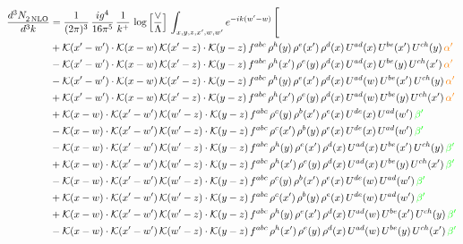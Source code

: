 \documentclass[9pt]{article}
\numberwithin{equation}{section}
\begin{document}
\begin{align}
  \frac{d^{3}N_{2\,\rm NLO}^{\rm}}{d^{3}k}  & = \frac{1}{(2\pi)^{3}}\, \frac{ig^{4}}{16\pi^{5}}\, \frac{1}{k^{+}}\, \log{\left[\frac{\vee}{\Lambda}\right]}\, \int_{x,y,z,x^{\prime},w,w^{\prime}}e^{-ik(w^{\prime}-w)}\, \Bigg[\notag \\ &   +\mathcal{K}(x'-w')\cdot\mathcal{K}(x-w)\,\mathcal{K}(x'-z)\cdot\mathcal{K}(y-z)\, f^{abc}\,\rho^{h}(y)\,\rho^{e}(x')\,\rho^{d}(x)\,U^{ad}(x)\,U^{be}(x')\,U^{ch}(y)\,{\color{orange}\alpha'}\notag\\ &-\mathcal{K}(x'-w')\cdot\mathcal{K}(x-w)\,\mathcal{K}(x'-z)\cdot\mathcal{K}(y-z)\, f^{abc}\,\rho^{h}(x')\,\rho^{e}(y)\,\rho^{d}(x)\,U^{ad}(x)\,U^{be}(y)\,U^{ch}(x')\,{\color{orange}\alpha'}\notag\\ &-\mathcal{K}(x'-w')\cdot\mathcal{K}(x-w)\,\mathcal{K}(x'-z)\cdot\mathcal{K}(y-z)\, f^{abc}\,\rho^{h}(y)\,\rho^{e}(x')\,\rho^{d}(x)\,U^{ad}(w)\,U^{be}(x')\,U^{ch}(y)\,{\color{orange}\alpha'}\notag \\ &+\mathcal{K}(x'-w')\cdot\mathcal{K}(x-w)\,\mathcal{K}(x'-z)\cdot\mathcal{K}(y-z)\, f^{abc}\,\rho^{h}(x')\,\rho^{e}(y)\,\rho^{d}(x)\,U^{ad}(w)\,U^{be}(y)\,U^{ch}(x')\,{\color{orange}\alpha'}\notag \\ & +\mathcal{K}(x-w)\cdot\mathcal{K}(x'-w')\,\mathcal{K}(w'-z)\cdot\mathcal{K}(y-z)\, f^{abc}\,\rho^{c}(y)\,\rho^{b}(x')\,\rho^{e}(x)\,U^{de}(x)\,U^{ad}(w')\,{\color{green}\beta'}\notag \\ &-\mathcal{K}(x-w)\cdot\mathcal{K}(x'-w')\,\mathcal{K}(w'-z)\cdot\mathcal{K}(y-z)\, f^{abc}\,\rho^{c}(x')\,\rho^{b}(y)\,\rho^{e}(x)\,U^{de}(x)\,U^{ad}(w')\,{\color{green}\beta'}\notag \\ & -\mathcal{K}(x-w)\cdot\mathcal{K}(x'-w')\,\mathcal{K}(w'-z)\cdot\mathcal{K}(y-z)\, f^{abc}\,\rho^{h}(y)\,\rho^{e}(x')\,\rho^{d}(x)\,U^{ad}(x)\,U^{be}(x')\,U^{ch}(y)\,{\color{green}\beta'}\notag\\ &+\mathcal{K}(x-w)\cdot\mathcal{K}(x'-w')\,\mathcal{K}(w'-z)\cdot\mathcal{K}(y-z)\, f^{abc}\,\rho^{h}(x')\,\rho^{e}(y)\,\rho^{d}(x)\,U^{ad}(x)\,U^{be}(y)\,U^{ch}(x')\,{\color{green}\beta'}\notag\\ &-\mathcal{K}(x-w)\cdot\mathcal{K}(x'-w')\,\mathcal{K}(w'-z)\cdot\mathcal{K}(y-z)\, f^{abc}\,\rho^{c}(y)\,\rho^{b}(x')\,\rho^{e}(x)\,U^{de}(w)\,U^{ad}(w')\,{\color{green}\beta'}\notag\\ &+\mathcal{K}(x-w)\cdot\mathcal{K}(x'-w')\,\mathcal{K}(w'-z)\cdot\mathcal{K}(y-z)\, f^{abc}\,\rho^{c}(x')\,\rho^{b}(y)\,\rho^{e}(x)\,U^{de}(w)\,U^{ad}(w')\,{\color{green}\beta'}\notag\\ &+\mathcal{K}(x-w)\cdot\mathcal{K}(x'-w')\,\mathcal{K}(w'-z)\cdot\mathcal{K}(y-z)\, f^{abc}\,\rho^{h}(y)\,\rho^{e}(x')\,\rho^{d}(x)\,U^{ad}(w)\,U^{be}(x')\,U^{ch}(y)\,{\color{green}\beta'}\notag \\ &-\mathcal{K}(x-w)\cdot\mathcal{K}(x'-w')\,\mathcal{K}(w'-z)\cdot\mathcal{K}(y-z)\, f^{abc}\,\rho^{h}(x')\,\rho^{e}(y)\,\rho^{d}(x)\,U^{ad}(w)\,U^{be}(y)\,U^{ch}(x')\,{\color{green}\beta'}
\end{align}  
\end{document}

